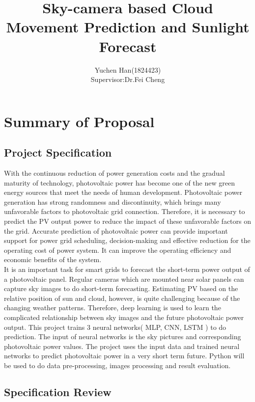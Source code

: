 \documentclass{elegantpaper}
\title{Sky-camera based Cloud Movement Prediction and Sunlight Forecast}
\author{Yuchen Han(1824423)\\{\small Supervisor:Dr.Fei Cheng}}
\date{}
\begin{document}
\maketitle

\section{Summary of Proposal}

\subsection{Project Specification}
With the continuous reduction of power generation costs and the gradual maturity of technology, photovoltaic power has become one of the new green energy sources that meet the needs of human development. Photovoltaic power generation has strong randomness and discontinuity, which brings many unfavorable factors to photovoltaic grid connection.\cite{li2016multi} Therefore, it is necessary to predict the PV output power to reduce the impact of these unfavorable factors on the grid. Accurate prediction of photovoltaic power can provide important support for power grid scheduling, decision-making and effective reduction for the operating cost of power system.\cite{wan2015photovoltaic} It can improve the operating efficiency and economic benefits of the system.\\[2ex]
It is an important task for smart grids to forecast the short-term power output of a photovoltaic panel. Regular cameras which are mounted near solar panels can capture sky images to do short-term forecasting.\cite{yang2014solar} Estimating PV  based on the  relative position of sun and cloud, however, is quite challenging because of the changing weather patterns.\cite{huld2012new} Therefore, deep learning is used to learn the complicated relationship between sky images and the future photovoltaic power output. This project trains 3  neural networks( MLP, CNN, LSTM ) to do prediction. The input of neural networks is the sky pictures and corresponding photovoltaic power values. The project uses the input data and   trained neural networks to predict photovoltaic power in a very short term future. Python will be used to do data pre-processing,  images processing and result evaluation.\\[2ex]





\subsection{Specification Review}
\end{document}
